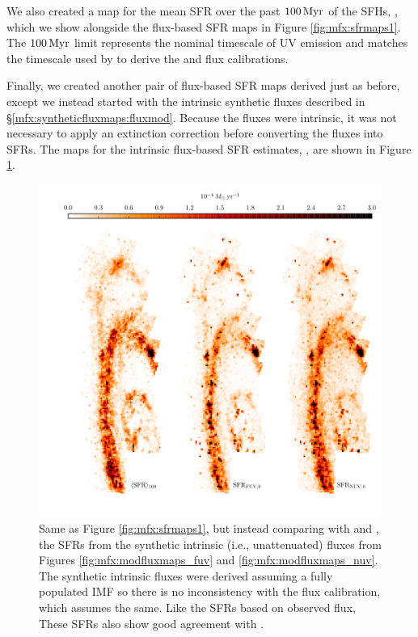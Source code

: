 We also created a map for the mean SFR over the past $100\,\mathrm{Myr}$ of the SFHs,
\sfroneh{}, which we show alongside the flux-based SFR maps in Figure
\ref{fig:mfx:sfrmaps1}. The $100\,\mathrm{Myr}$ limit represents the nominal timescale of
UV emission and matches the timescale used by \citet{Hao:2011} to derive the
\fuv{} and \nuv{} flux calibrations.

Finally, we created another pair of flux-based SFR maps derived just as before,
except we instead started with the intrinsic synthetic fluxes \fxsfhz{}
described in \S \ref{mfx:syntheticfluxmaps:fluxmod}. Because the fluxes were
intrinsic, it was not necessary to apply an extinction correction before
converting the fluxes into SFRs. The maps for the intrinsic flux-based SFR
estimates, \sfrxz{}, are shown in Figure \ref{fig:mfx:sfrmaps2}.


\begin{figure}
\centering
\includegraphics[width=\textwidth]{m31flux-figures/sfrmaps2.pdf}
\caption[SFR maps from estimates based on synthetic intrinsic fluxes compared
    with the mean SFR map from the SFHs.]{Same as Figure
    \ref{fig:mfx:sfrmaps1}, but instead comparing \sfroneh{} with \sfrfuvz{}
    and \sfrnuvz{}, the SFRs from the synthetic intrinsic (i.e., unattenuated)
    fluxes from Figures \ref{fig:mfx:modfluxmaps_fuv} and
    \ref{fig:mfx:modfluxmaps_nuv}. The synthetic intrinsic fluxes were derived
    assuming a fully populated IMF so there is no inconsistency with the flux
    calibration, which assumes the same. Like the SFRs based on observed flux,
    These SFRs also show good agreement with \sfroneh{}.
}
\label{fig:mfx:sfrmaps2}
\end{figure}





